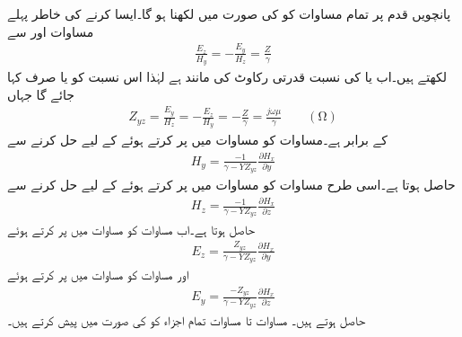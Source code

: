 پانچویں قدم پر تمام مساوات کو  کی صورت میں لکھنا ہو گا۔ایسا کرنے کی خاطر پہلے مساوات  اور  سے
\begin{align}\label{مساوات_مویج_ح}
\frac{E_z}{H_y}=-\frac{E_y}{H_z}=\frac{Z}{\gamma}
\end{align}
لکھتے ہیں۔اب  یا  کی نسبت  قدرتی رکاوٹ کی مانند ہے لہٰذا اس نسبت  کو   یا صرف  کہا جائے گا جہاں
\begin{align}\label{مساوات_مویج_خ}
Z_{yz}=\frac{E_y}{H_z}=-\frac{E_z}{H_y}=-\frac{Z}{\gamma}=\frac{j\omega \mu}{\gamma}  \quad \quad (\si{\ohm})
\end{align}
کے برابر ہے۔مساوات  کو مساوات  میں پر کرتے ہوئے  کے لیے حل کرنے سے
\begin{align}\label{مساوات_مویج_د}
H_y=\frac{-1}{\gamma-Y Z_{yz}} \frac{\partial H_x}{\partial y}
\end{align}
حاصل ہوتا ہے۔اسی طرح  مساوات  کو مساوات  میں پر کرتے ہوئے  کے لیے حل کرنے سے
\begin{align}\label{مساوات_مویج_ڈ}
H_z=\frac{-1}{\gamma-Y Z_{yz}} \frac{\partial H_x}{\partial z}
\end{align}
حاصل ہوتا ہے۔اب مساوات  کو مساوات  میں پر کرتے ہوئے
\begin{align}\label{مساوات_مویج_ذ}
E_z=\frac{Z_{yz}}{\gamma-Y Z_{yz}}\frac{\partial H_x}{\partial y}
\end{align}
اور مساوات  کو مساوات  میں پر کرتے ہوئے
\begin{align}\label{مساوات_مویج_ر}
E_y=\frac{-Z_{yz}}{\gamma-Y Z_{yz}}\frac{\partial H_x}{\partial z}
\end{align}
حاصل ہوتے ہیں۔ مساوات  تا مساوات  تمام اجزاء کو  کی صورت میں پیش کرتے ہیں۔ 

